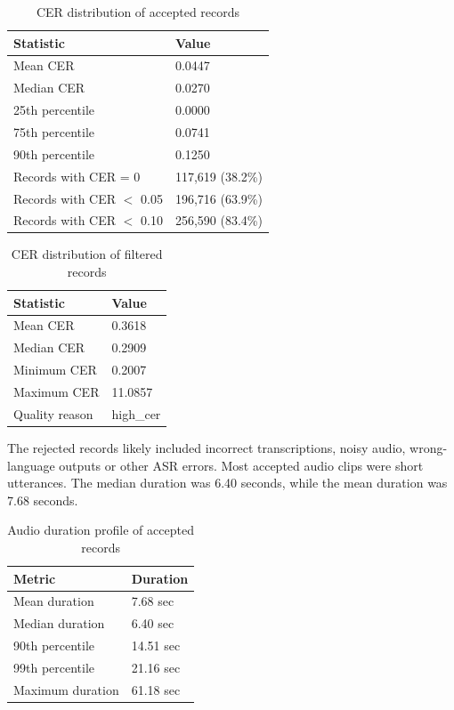 \documentclass[12pt,oneside,openright,a4paper]{cpe-english-project}
\begin{document}
\begin{table}[H]
\centering
\caption{CER distribution of accepted records}\label{tbl:cer-accept}
\begin{tabular}{|p{}|p{}|}
\hline
\textbf{Statistic} & \textbf{Value} \\ \hline
Mean CER & 0.0447 \\ \hline
Median CER & 0.0270 \\ \hline
25th percentile & 0.0000 \\ \hline
75th percentile & 0.0741 \\ \hline
90th percentile & 0.1250 \\ \hline
Records with CER = 0 & 117{,}619 (38.2\%) \\ \hline
Records with CER $<$ 0.05 & 196{,}716 (63.9\%) \\ \hline
Records with CER $<$ 0.10 & 256{,}590 (83.4\%) \\ \hline
\end{tabular}
\end{table}

\begin{table}[H]
\centering
\caption{CER distribution of filtered records}\label{tbl:cer-filtered}
\begin{tabular}{|p{}|p{}|}
\hline
\textbf{Statistic} & \textbf{Value} \\ \hline
Mean CER & 0.3618 \\ \hline
Median CER & 0.2909 \\ \hline
Minimum CER & 0.2007 \\ \hline
Maximum CER & 11.0857 \\ \hline
Quality reason & high\_cer \\ \hline
\end{tabular}
\end{table}

The rejected records likely included incorrect transcriptions, noisy audio, wrong-language outputs or other ASR errors. Most accepted audio clips were short utterances. The median duration was 6.40 seconds, while the mean duration was 7.68 seconds.

\begin{table}[H]
\centering
\caption{Audio duration profile of accepted records}\label{tbl:audio-duration}
\begin{tabular}{|p{}|p{}|}
\hline
\textbf{Metric} & \textbf{Duration} \\ \hline
Mean duration & 7.68 sec \\ \hline
Median duration & 6.40 sec \\ \hline
90th percentile & 14.51 sec \\ \hline
99th percentile & 21.16 sec \\ \hline
Maximum duration & 61.18 sec \\ \hline
\end{tabular}
\end{table}
\end{document}
